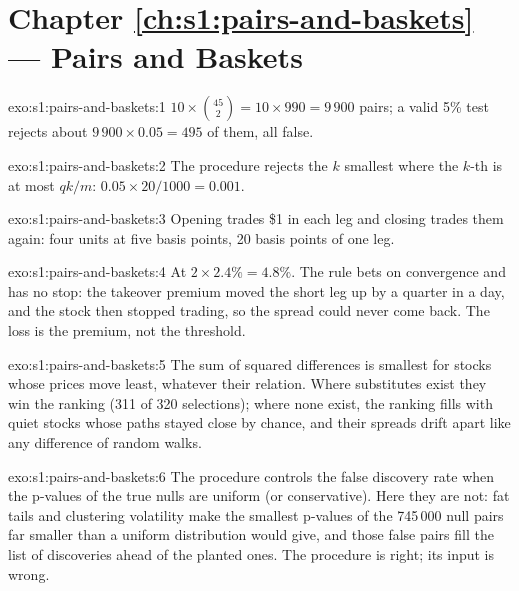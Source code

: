 \section*{Chapter \ref{ch:s1:pairs-and-baskets} --- Pairs and Baskets}

\begin{solution}{exo:s1:pairs-and-baskets:1}
$10 \times \binom{45}{2} = 10 \times 990 = 9\,900$ pairs; a valid 5\% test rejects about $9\,900 \times 0.05 = 495$ of them, all false.
\end{solution}

\begin{solution}{exo:s1:pairs-and-baskets:2}
The procedure rejects the $k$ smallest where the $k$-th is at most $qk/m$: $0.05 \times 20/1000 = 0.001$.
\end{solution}

\begin{solution}{exo:s1:pairs-and-baskets:3}
Opening trades \$1 in each leg and closing trades them again: four units at five basis points, 20 basis points of one leg.
\end{solution}

\begin{solution}{exo:s1:pairs-and-baskets:4}
At $2 \times 2.4\% = 4.8\%$. The rule bets on convergence and has no stop: the takeover premium moved the short leg up by a quarter in a day, and the stock
then stopped trading, so the spread could never come back. The loss is the premium, not the threshold.
\end{solution}

\begin{solution}{exo:s1:pairs-and-baskets:5}
The sum of squared differences is smallest for stocks whose prices move least, whatever their relation. Where substitutes exist they win the ranking (311
of 320 selections); where none exist, the ranking fills with quiet stocks whose paths stayed close by chance, and their spreads drift apart like any
difference of random walks.
\end{solution}

\begin{solution}{exo:s1:pairs-and-baskets:6}
The procedure controls the false discovery rate when the p-values of the true nulls are uniform (or conservative). Here they are not: fat tails and
clustering volatility make the smallest p-values of the 745\,000 null pairs far smaller than a uniform distribution would give, and those false pairs fill the
list of discoveries ahead of the planted ones. The procedure is right; its input is wrong.
\end{solution}

